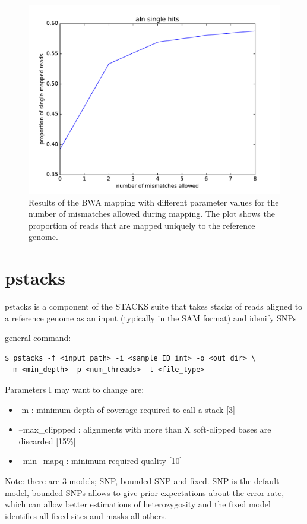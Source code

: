 \documentclass[10pt,a4paper]{report}
\begin{document}
\begin{figure}[h]
\includegraphics[scale=0.5]{param_space/mapstats}
\caption{Results of the BWA mapping with different parameter values for the number of mismatches allowed during mapping. The plot shows the proportion of reads that are mapped uniquely to the reference genome.}
\label{map_results}
\end{figure}

\section{pstacks}

pstacks is a component of the STACKS suite that takes stacks of reads aligned to a reference genome as an input (typically in the SAM format) and idenify SNPs

general command: 
\begin{lstlisting}
$ pstacks -f <input_path> -i <sample_ID_int> -o <out_dir> \
 -m <min_depth> -p <num_threads> -t <file_type>
\end{lstlisting}

Parameters I may want to change are: 
\begin{itemize}
\item -m : minimum depth of coverage required to call a stack [3]
\item --max\_clippped : alignments with more than X soft-clipped bases are discarded [15\%]
\item --min\_mapq : minimum required quality [10]
\end{itemize}

Note: there are 3 models; SNP, bounded SNP and fixed. SNP is the default model, bounded SNPs allows to give prior expectations about the error rate, which can allow better estimations of heterozygosity and the fixed model identifies all fixed sites and masks all others.
\end{document}
